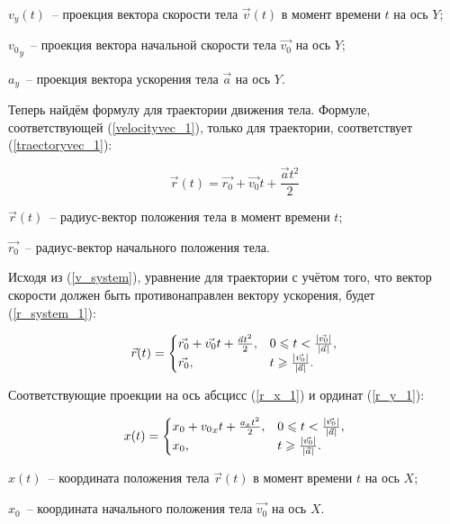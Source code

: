 \begin{Underequation}
  \(v_y(t)\)~-- проекция вектора скорости тела \(\vec{v}(t)\) в момент времени \(t\) на ось \(Y\);

  \({v_0}_y\)~-- проекция вектора начальной скорости тела \(\vec{v_0}\) на ось \(Y\);

  \(a_y\)~-- проекция вектора ускорения тела \(\vec{a}\) на ось \(Y\).
\end{Underequation}

Теперь найдём формулу для траектории движения тела. Формуле, соответствующей (\ref{velocityvec_1}),
только для траектории, соответствует (\ref{traectoryvec_1}):

\begin{equation}\label{traectoryvec_1}
  \vec{r}(t) = \vec{r_0} + \vec{v_0}t + \frac{\vec{a}t^2}{2}
\end{equation}

\begin{Underequation}
  \(\vec{r}(t)\)~-- радиус-вектор положения тела в момент времени \(t\);

  \(\vec{r_0}\)~-- радиус-вектор начального положения тела.
\end{Underequation}

Исходя из (\ref{v_system}), уравнение для траектории с учётом того, что вектор скорости должен быть
противонаправлен вектору ускорения, будет (\ref{r_system_1}):

\begin{equation}\label{r_system_1}
  \vec{r}(t) = \begin{cases}
    \vec{r_0} + \vec{v_0}t + \frac{\vec{a}t^2}{2}, & 0 \leqslant t < \frac{\left|\vec{v_0}\right|}{\left|\vec{a}\right|}, \\
    \vec{r_0},                                     & t \geqslant \frac{\left|\vec{v_0}\right|}{\left|\vec{a}\right|} .
  \end{cases}
\end{equation}

Соответствующие проекции на ось абсцисс (\ref{r_x_1}) и ординат (\ref{r_y_1}):

\begin{equation}\label{r_x_1}
  x(t) =
  \begin{cases}
    x_0 + {v_0}_x t + \frac{a_x t^2}{2}, & 0 \leqslant t < \frac{\left|\vec{v_0}\right|}{\left|\vec{a}\right|}, \\
    x_0,                                 & t \geqslant \frac{\left|\vec{v_0}\right|}{\left|\vec{a}\right|}.
  \end{cases}
\end{equation}

\begin{Underequation}
  \(x(t)\)~-- координата положения тела \(\vec{r}(t)\) в момент времени \(t\) на ось \(X\);

  \(x_0\)~-- координата начального положения тела \(\vec{v_0}\) на ось \(X\).
\end{Underequation}

